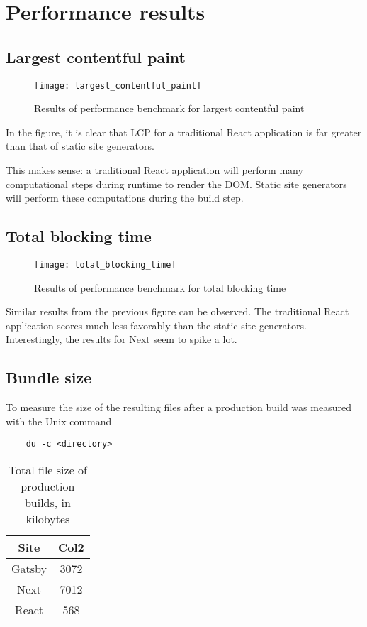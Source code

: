 \chapter{Performance results} %

\label{Chapter4} 

\section{Largest contentful paint}

\begin{figure}[h!]
	\texttt{[image: largest\_contentful\_paint]}
	\caption{Results of performance benchmark for largest contentful paint}
	\label{fig:largest_contentful_paint}
\end{figure}

In the figure, it is clear that LCP for a traditional React application is far greater than that of static site generators.

This makes sense: a traditional React application will perform many computational steps during runtime to render the DOM.
Static site generators will perform these computations during the build step.

\section{Total blocking time}


\begin{figure}[h!]
	\texttt{[image: total\_blocking\_time]}
	\caption{Results of performance benchmark for total blocking time}
	\label{fig:total_blocking_time}
\end{figure}

Similar results from the previous figure can be observed. 
The traditional React application scores much less favorably than the static site generators.
Interestingly, the results for Next seem to spike a lot.

\section{Bundle size}

To measure the size of the resulting files after a production build was measured with the Unix command 

\begin{verbatim}
	du -c <directory>
\end{verbatim}

\begin{table}[h!]
	\begin{center}
		\begin{tabular}{||c c||} 
			\hline
			Site   & Col2 \\ [0.5ex] 
			\hline\hline
			Gatsby & 3072 \\ 
			\hline
			Next   & 7012 \\
			\hline
			React  & 568  \\[1ex] 
			\hline
		\end{tabular}
		\caption{Total file size of production builds, in kilobytes }
	\end{center}
\end{table}

